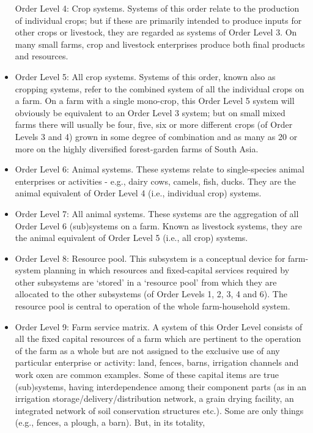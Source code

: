 \documentclass[11pt,]{book}
\theoremstyle{definition}
\theoremstyle{definition}
\theoremstyle{definition}
\theoremstyle{remark}
\begin{document}
\begin{itemize}
  Order Level 4: Crop systems. Systems of this order relate to the
  production of individual crops; but if these are primarily intended to
  produce inputs for other crops or livestock, they are regarded as
  systems of Order Level 3. On many small farms, crop and livestock
  enterprises produce both final products and resources.
\item
  Order Level 5: All crop systems. Systems of this order, known also as
  cropping systems, refer to the combined system of all the individual
  crops on a farm. On a farm with a single mono-crop, this Order Level 5
  system will obviously be equivalent to an Order Level 3 system; but on
  small mixed farms there will usually be four, five, six or more
  different crops (of Order Levels 3 and 4) grown in some degree of
  combination and as many as 20 or more on the highly diversified
  forest-garden farms of South Asia.
\item
  Order Level 6: Animal systems. These systems relate to single-species
  animal enterprises or activities - e.g., dairy cows, camels, fish,
  ducks. They are the animal equivalent of Order Level 4 (i.e.,
  individual crop) systems.
\item
  Order Level 7: All animal systems. These systems are the aggregation
  of all Order Level 6 (sub)systems on a farm. Known as livestock
  systems, they are the animal equivalent of Order Level 5 (i.e., all
  crop) systems.
\item
  Order Level 8: Resource pool. This subsystem is a conceptual device
  for farm-system planning in which resources and fixed-capital services
  required by other subsystems are `stored' in a `resource pool' from
  which they are allocated to the other subsystems (of Order Levels 1,
  2, 3, 4 and 6). The resource pool is central to operation of the whole
  farm-household system.
\item
  Order Level 9: Farm service matrix. A system of this Order Level
  consists of all the fixed capital resources of a farm which are
  pertinent to the operation of the farm as a whole but are not assigned
  to the exclusive use of any particular enterprise or activity: land,
  fences, barns, irrigation channels and work oxen are common examples.
  Some of these capital items are true (sub)systems, having
  interdependence among their component parts (as in an irrigation
  storage/delivery/distribution network, a grain drying facility, an
  integrated network of soil conservation structures etc.). Some are
  only things (e.g., fences, a plough, a barn). But, in its totality,

\end{itemize}
\end{document}
